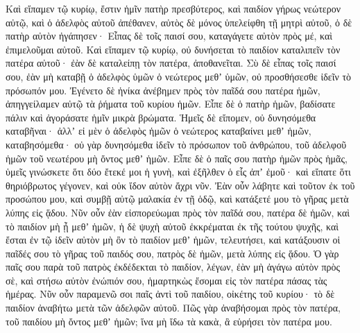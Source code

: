 {Καὶ εἴπαμεν τῷ κυρίῳ, ἔστιν ἡμῖν πατὴρ πρεσβύτερος, καὶ παιδίον γήρως νεώτερον αὐτῷ, καὶ ὁ ἀδελφὸς αὐτοῦ ἀπέθανεν, αὐτὸς δὲ μόνος ὑπελείφθη τῇ μητρὶ αὐτοῦ, ὁ δὲ πατὴρ αὐτὸν ἠγάπησεν·
Εἶπας δὲ τοῖς παισί σου, καταγάγετε αὐτὸν πρὸς μέ, καὶ ἐπιμελοῦμαι αὐτοῦ.
Καὶ εἴπαμεν τῷ κυρίῳ, οὐ δυνήσεται τὸ παιδίον καταλιπεῖν τὸν πατέρα αὐτοῦ· ἐὰν δὲ καταλείπῃ τὸν πατέρα, ἀποθανεῖται.
Σὺ δὲ εἶπας τοῖς παισί σου, ἐὰν μὴ καταβῇ ὁ ἀδελφὸς ὑμῶν ὁ νεώτερος μεθʼ ὑμῶν, οὐ προσθήσεσθε ἰδεῖν τὸ πρόσωπόν μου.
Ἐγένετο δὲ ἡνίκα ἀνέβημεν πρὸς τὸν παῖδά σου πατέρα ἡμῶν, ἀπηγγείλαμεν αὐτῷ τὰ ῥήματα τοῦ κυρίου ἡμῶν.
Εἶπε δὲ ὁ πατὴρ ἡμῶν, βαδίσατε πάλιν καὶ ἀγοράσατε ἡμῖν μικρὰ βρώματα.
Ἡμεῖς δὲ εἴπομεν, οὐ δυνησόμεθα καταβῆναι· ἀλλʼ εἰ μὲν ὁ ἀδελφὸς ἡμῶν ὁ νεώτερος καταβαίνει μεθʼ ἡμῶν, καταβησόμεθα· οὐ γὰρ δυνησόμεθα ἰδεῖν τὸ πρόσωπον τοῦ ἀνθρώπου, τοῦ ἀδελφοῦ ἡμῶν τοῦ νεωτέρου μὴ ὄντος μεθʼ ἡμῶν.
Εἶπε δὲ ὁ παῖς σου πατὴρ ἡμῶν πρὸς ἡμᾶς, ὑμεῖς γινώσκετε ὅτι δύο ἔτεκέ μοι ἡ γυνὴ,
καὶ ἐξῆλθεν ὁ εἷς ἀπʼ ἐμοῦ· καὶ εἴπατε ὅτι θηριόβρωτος γέγονεν, καὶ οὐκ ἴδον αὐτὸν ἄχρι νῦν.
Ἐὰν οὖν λάβητε καὶ τοῦτον ἐκ τοῦ προσώπου μου, καὶ συμβῇ αὐτῷ μαλακία ἐν τῇ ὁδῷ, καὶ κατάξετέ μου τὸ γῆρας μετὰ λύπης εἰς ᾅδου.
Νῦν οὖν ἐὰν εἰσπορεύωμαι πρὸς τὸν παῖδά σου, πατέρα δὲ ἡμῶν, καὶ τὸ παιδίον μὴ ᾖ μεθʼ ἡμῶν, ἡ δὲ ψυχὴ αὐτοῦ ἐκκρέμαται ἐκ τῆς τούτου ψυχῆς,
καὶ ἔσται ἐν τῷ ἰδεῖν αὐτὸν μὴ ὂν τὸ παιδίον μεθʼ ἡμῶν, τελευτήσει, καὶ κατάξουσιν οἱ παῖδές σου τὸ γῆρας τοῦ παιδός σου, πατρὸς δὲ ἡμῶν, μετὰ λύπης εἰς ᾅδου.
Ὁ γὰρ παῖς σου παρὰ τοῦ πατρὸς ἐκδέδεκται τὸ παιδίον, λέγων, ἐὰν μὴ ἀγάγω αὐτὸν πρὸς σὲ, καὶ στήσω αὐτὸν ἐνώπιόν σου, ἡμαρτηκὼς ἔσομαι εἰς τὸν πατέρα πάσας τὰς ἡμέρας.
Νῦν οὖν παραμενῶ σοι παῖς ἀντὶ τοῦ παιδίου, οἰκέτης τοῦ κυρίου· τὸ δὲ παιδίον ἀναβήτω μετὰ τῶν ἀδελφῶν αὐτοῦ.
Πῶς γὰρ ἀναβήσομαι πρὸς τὸν πατέρα, τοῦ παιδίου μὴ ὄντος μεθʼ ἡμῶν; ἵνα μὴ ἴδω τὰ κακὰ, ἃ εὑρήσει τὸν πατέρα μου.

}

